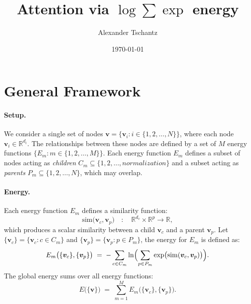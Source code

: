 \documentclass{article}
\begin{document}
\title{Attention via \(\log \sum \exp\) energy}
\author{Alexander Tschantz}
\date{\today}
\maketitle

\section{General Framework}

\paragraph{Setup.}  
We consider a single set of nodes \(\bm{v} = \{\bm{v}_i : i \in \{1, 2, \ldots, N\}\}\), where each node \(\bm{v}_i \in \mathbb{R}^{d_i}\). The relationships between these nodes are defined by a set of \(M\) energy functions \(\{E_m : m \in \{1, 2, \ldots, M\}\}\). Each energy function \(E_m\) defines a subset of nodes acting as \emph{children} \(C_m \subseteq \{1, 2, \ldots, normalization\}\) and a subset acting as \emph{parents} \(P_m \subseteq \{1, 2, \ldots, N\}\), which may overlap.

\paragraph{Energy.}  
Each energy function \(E_m\) defines a similarity function:
\begin{equation}
\mathrm{sim}\bigl(\bm{v}_c, \bm{v}_p\bigr) \quad:\quad \mathbb{R}^{d_c} \times \mathbb{R}^{p} \to \mathbb{R},
\end{equation}
which produces a scalar similarity between a child \(\bm{v}_c\) and a parent \(\bm{v}_p\). Let \( \{ \bm{v}_c \} = \{\bm{v}_c : c \in C_m\}\) and \( \{ \bm{v}_p \} = \{\bm{v}_p : p \in P_m\}\), the energy for \(E_m\) is defined as:
\begin{equation}
E_m\bigl(\{ \bm{v}_c \} , \{ \bm{v}_p \} \bigr)
\;=\;
-\sum_{c \in C_m}
\ln \Bigl(
\sum_{p \in P_m}
\exp\bigl(\mathrm{sim}(\bm{v}_c, \bm{v}_p)\bigr)
\Bigr).
\end{equation}
The global energy sums over all energy functions:
\begin{equation}
E\bigl(\{ \bm{v} \} \bigr)
\;=\;
\sum_{m=1}^M
E_m\bigl(\{ \bm{v}_c \} , \{ \bm{v}_p \} \bigr).
\end{equation}
\end{document}
